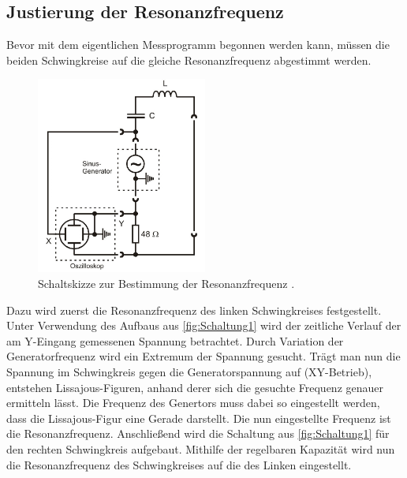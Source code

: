\subsection{Justierung der Resonanzfrequenz}
\label{subsec:Justierung}
Bevor mit dem eigentlichen Messprogramm begonnen werden kann, müssen die beiden Schwingkreise auf die gleiche Resonanzfrequenz abgestimmt werden.
\begin{figure}
    \centering
	\caption{Schaltskizze zur Bestimmung der Resonanzfrequenz \cite{v355}.}
    \label{fig:Schaltung1}
    \includegraphics[width=0.5\textwidth]{content/Schaltung1.jpg}
\end{figure}
Dazu wird zuerst die Resonanzfrequenz des linken Schwingkreises festgestellt. Unter Verwendung des Aufbaus aus \autoref{fig:Schaltung1} wird 
der zeitliche Verlauf der am Y-Eingang gemessenen Spannung betrachtet. Durch Variation der Generatorfrequenz wird ein Extremum der Spannung gesucht. Trägt 
man nun die Spannung im Schwingkreis gegen die Generatorspannung auf (XY-Betrieb), entstehen Lissajous-Figuren, anhand derer sich die gesuchte Frequenz genauer
ermitteln lässt. Die Frequenz des Genertors muss dabei so eingestellt werden, dass die Lissajous-Figur eine Gerade darstellt. Die nun eingestellte Frequenz ist
die Resonanzfrequenz. Anschließend wird die Schaltung aus \autoref{fig:Schaltung1} für den rechten Schwingkreis aufgebaut. Mithilfe der regelbaren Kapazität
wird nun die Resonanzfrequenz des Schwingkreises auf die des Linken eingestellt.

